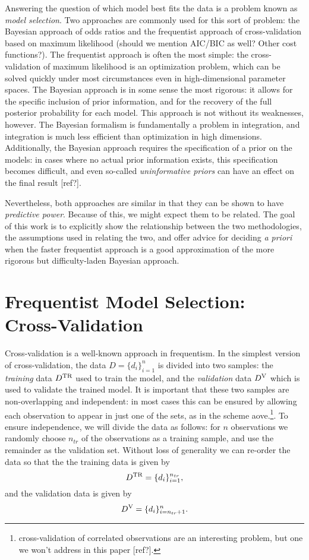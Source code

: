 \documentclass[12pt]{article}
\newcommand{\Dtr}{\ensuremath{D^{\rm TR}}}
\newcommand{\Dva}{\ensuremath{D^{\rm V}}}
\begin{document}
Answering the question of which model best fits the data is a problem known
as {\it model selection}.  Two approaches are commonly used for this sort
of problem: the Bayesian approach of odds ratios and the frequentist approach
of cross-validation based on maximum likelihood
(should we mention AIC/BIC as well? Other cost functions?).
The frequentist approach is often the most simple: the cross-validation of
maximum likelihood is an optimization problem, which can be solved quickly
under most circumstances even in high-dimensional parameter spaces.
The Bayesian approach is in some sense the most rigorous: it allows for the
specific inclusion of prior information, and for the recovery of the full
posterior probability for each model.  This approach is not without its
weaknesses, however.  The Bayesian formalism is fundamentally a problem in
integration, and integration is much less efficient than optimization in
high dimensions.  Additionally, the Bayesian approach requires the
specification of a prior on the models: in cases where no actual prior
information exists, this specification becomes difficult, and even
so-called {\it uninformative priors} can have an effect on the final
result [ref?].

Nevertheless, both approaches are similar in that they can be shown to
have {\it predictive power}.  Because of this, we might expect them to
be related.  The goal of this work is to explicitly show the relationship
between the two methodologies, the assumptions used in relating the two,
and offer advice for deciding {\it a priori} when the faster frequentist
approach is a good approximation of the more rigorous but difficulty-laden
Bayesian approach.

\section{Frequentist Model Selection: Cross-Validation}
Cross-validation is a well-known approach in frequentism.  In the simplest
version of cross-validation, the data $D = \{d_i\}_{i=1}^n$
is divided into two samples:
the {\it training} data \Dtr{} used to train the model, and the
{\it validation} data \Dva{} which is used to validate the trained
model. It is important that these two samples are
non-overlapping and independent: in most cases this can be ensured by
allowing each observation to appear in just one of the sets, as in the
scheme aove.\footnote{cross-validation of correlated observations are
an interesting problem, but one we won't address in this paper [ref?].}.
To ensure independence, we will divide the data as follows: for $n$
observations we randomly choose $n_{tr}$ of the observations
as a training sample, and use the remainder as the validation set.
Without loss of generality we can re-order the data so that the
the training data is given by
\begin{equation}
  \Dtr = \{d_i\}_{i=1}^{n_{tr}},
\end{equation}
and the validation data is given by
\begin{equation}
  \Dva = \{d_i\}_{i=n_{tr}+1}^{n}.
\end{equation}
\end{document}
